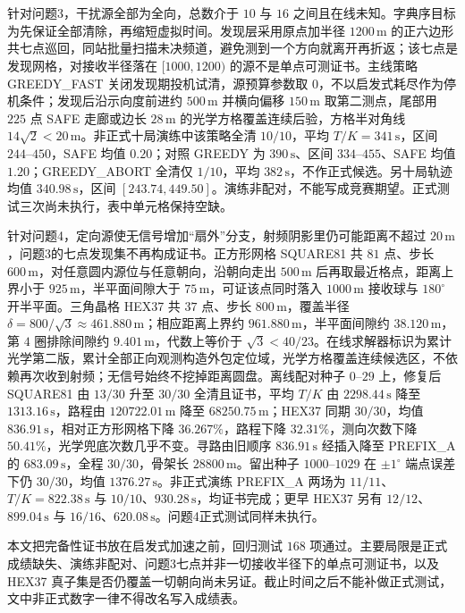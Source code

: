 \documentclass[withoutpreface,bwprint]{cumcmthesis}
\makeatletter
\renewenvironment{abstract}{%
  \if@twocolumn\section*{\abstractname}%
  \else\begin{center}{\zihao{4}\bfseries \abstractname\vspace{-.5em}\vspace{\z@}}\end{center}\quotation
  \fi}{\if@twocolumn\else\endquotation\newpage\fi}
\makeatother
\begin{document}
\begin{abstract}
针对问题3，干扰源全部为全向，总数介于 $10$ 与 $16$ 之间且在线未知。字典序目标为先保证全部清除，再缩短虚拟时间。发现层采用原点加半径 $1200\,\mathrm{m}$ 的正六边形共七点巡回，同站批量扫描未决频道，避免测到一个方向就离开再折返；该七点是发现网格，对接收半径落在 $[1000,1200)$ 的源不是单点可测证书。主线策略 GREEDY\_FAST 关闭发现期投机试清，源预算参数取 $0$，不以启发式耗尽作为停机条件；发现后沿示向度前进约 $500\,\mathrm{m}$ 并横向偏移 $150\,\mathrm{m}$ 取第二测点，尾部用 $225$ 点 SAFE 走廊或边长 $28\,\mathrm{m}$ 的光学方格覆盖连续后验，方格半对角线 $14\sqrt{2}<20\,\mathrm{m}$。非正式十局演练中该策略全清 $10/10$，平均 $T/K=341\,\mathrm{s}$，区间 $244$--$450$，SAFE 均值 $0.20$；对照 GREEDY 为 $390\,\mathrm{s}$、区间 $334$--$455$、SAFE 均值 $1.20$；GREEDY\_ABORT 全清仅 $1/10$，平均 $382\,\mathrm{s}$，不作正式候选。另十局轨迹均值 $340.98\,\mathrm{s}$，区间 $[243.74,449.50]$。演练非配对，不能写成竞赛期望。正式测试三次尚未执行，表中单元格保持空缺。

针对问题4，定向源使无信号增加“扇外”分支，射频阴影里仍可能距离不超过 $20\,\mathrm{m}$，问题3的七点发现集不再构成证书。正方形网格 SQUARE81 共 $81$ 点、步长 $600\,\mathrm{m}$，对任意圆内源位与任意朝向，沿朝向走出 $500\,\mathrm{m}$ 后再取最近格点，距离上界小于 $925\,\mathrm{m}$，半平面间隙大于 $75\,\mathrm{m}$，可证该点同时落入 $1000\,\mathrm{m}$ 接收球与 $180^\circ$ 开半平面。三角晶格 HEX37 共 $37$ 点、步长 $800\,\mathrm{m}$，覆盖半径 $\delta=800/\sqrt{3}\approx 461.880\,\mathrm{m}$；相应距离上界约 $961.880\,\mathrm{m}$，半平面间隙约 $38.120\,\mathrm{m}$，第 $4$ 圈排除间隙约 $9.401\,\mathrm{m}$，代数上等价于 $\sqrt{3}<40/23$。在线求解器标识为累计光学第二版，累计全部正向观测构造外包定位域，光学方格覆盖连续候选区，不依赖再次收到射频；无信号始终不挖掉距离圆盘。离线配对种子 $0$--$29$ 上，修复后 SQUARE81 由 $13/30$ 升至 $30/30$ 全清且证书，平均 $T/K$ 由 $2298.44\,\mathrm{s}$ 降至 $1313.16\,\mathrm{s}$，路程由 $120722.01\,\mathrm{m}$ 降至 $68250.75\,\mathrm{m}$；HEX37 同期 $30/30$，均值 $836.91\,\mathrm{s}$，相对正方形网格下降 $36.267\%$，路程下降 $32.31\%$，测向次数下降 $50.41\%$，光学兜底次数几乎不变。寻路由旧顺序 $836.91\,\mathrm{s}$ 经插入降至 PREFIX\_A 的 $683.09\,\mathrm{s}$，全程 $30/30$，骨架长 $28800\,\mathrm{m}$。留出种子 $1000$--$1029$ 在 $\pm 1^\circ$ 端点误差下仍 $30/30$，均值 $1376.27\,\mathrm{s}$。非正式演练 PREFIX\_A 两场为 $11/11$、$T/K=822.38\,\mathrm{s}$ 与 $10/10$、$930.28\,\mathrm{s}$，均证书完成；更早 HEX37 另有 $12/12$、$899.04\,\mathrm{s}$ 与 $16/16$、$620.08\,\mathrm{s}$。问题4正式测试同样未执行。

本文把完备性证书放在启发式加速之前，回归测试 $168$ 项通过。主要局限是正式成绩缺失、演练非配对、问题3七点并非一切接收半径下的单点可测证书，以及 HEX37 真子集是否仍覆盖一切朝向尚未另证。截止时间之后不能补做正式测试，文中非正式数字一律不得改名写入成绩表。

\end{abstract}
\end{document}
